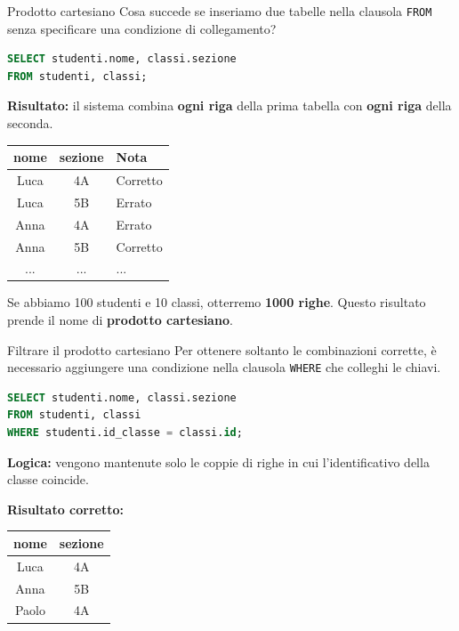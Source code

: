 \documentclass{beamer}
\begin{document}
\begin{frame}[fragile]{Prodotto cartesiano}
Cosa succede se inseriamo due tabelle nella clausola \texttt{FROM} senza specificare una condizione di collegamento?

\begin{lstlisting}[language=SQL]
SELECT studenti.nome, classi.sezione
FROM studenti, classi;
\end{lstlisting}

\textbf{Risultato:} il sistema combina \textbf{ogni riga} della prima tabella con \textbf{ogni riga} della seconda.

\begin{center}
\begin{tabular}{|c|c|l|}
\hline
\textbf{nome} & \textbf{sezione} & \textbf{Nota} \\ \hline
Luca & 4A & Corretto \\ \hline
Luca & 5B & \color{red} Errato \\ \hline
Anna & 4A & \color{red} Errato \\ \hline
Anna & 5B & Corretto \\ \hline
... & ... & ... \\ \hline
\end{tabular}
\end{center}

\medskip
Se abbiamo 100 studenti e 10 classi, otterremo \textbf{1000 righe}. Questo risultato prende il nome di \textbf{prodotto cartesiano}.
\end{frame}


\begin{frame}[fragile]{Filtrare il prodotto cartesiano}
Per ottenere soltanto le combinazioni corrette, è necessario aggiungere una condizione nella clausola \texttt{WHERE} che colleghi le chiavi.

\begin{lstlisting}[language=SQL]
SELECT studenti.nome, classi.sezione
FROM studenti, classi
WHERE studenti.id_classe = classi.id;
\end{lstlisting}

\textbf{Logica:} vengono mantenute solo le coppie di righe in cui l'identificativo della classe coincide.

\medskip
\textbf{Risultato corretto:}
\begin{center}
\begin{tabular}{|c|c|}
\hline
\textbf{nome} & \textbf{sezione} \\ \hline
Luca & 4A \\ \hline
Anna & 5B \\ \hline
Paolo & 4A \\ \hline
\end{tabular}
\end{center}
\end{frame}
\end{document}
